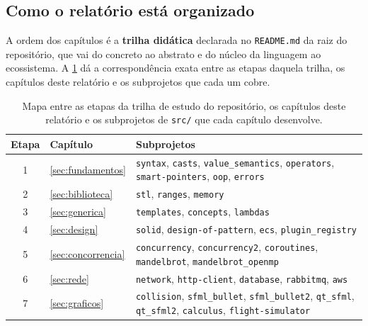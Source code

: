 \subsection{Como o relatório está organizado}
\label{sec:organizacao}

A ordem dos capítulos é a \textbf{trilha didática} declarada no
\texttt{README.md} da raiz do repositório, que vai do concreto ao abstrato e do
núcleo da linguagem ao ecossistema. A \cref{tab:mapa-capitulos} dá a
correspondência exata entre as etapas daquela trilha, os capítulos deste
relatório e os subprojetos que cada um cobre.

\begin{table}[htbp]
\centering
\caption{Mapa entre as etapas da trilha de estudo do repositório, os capítulos
         deste relatório e os subprojetos de \texttt{src/} que cada capítulo
         desenvolve.}
\label{tab:mapa-capitulos}
\footnotesize
\begin{tabular}{@{}clp{}@{}}
\toprule
\textbf{Etapa} & \textbf{Capítulo} & \textbf{Subprojetos} \\
\midrule
1 & \cref{sec:fundamentos}  & \texttt{syntax}, \texttt{casts},
                               \texttt{value\_semantics}, \texttt{operators},
                               \texttt{smart-pointers}, \texttt{oop},
                               \texttt{errors} \\
2 & \cref{sec:biblioteca}   & \texttt{stl}, \texttt{ranges}, \texttt{memory} \\
3 & \cref{sec:generica}     & \texttt{templates}, \texttt{concepts},
                               \texttt{lambdas} \\
4 & \cref{sec:design}       & \texttt{solid}, \texttt{design-of-pattern},
                               \texttt{ecs}, \texttt{plugin\_registry} \\
5 & \cref{sec:concorrencia} & \texttt{concurrency}, \texttt{concurrency2},
                               \texttt{coroutines}, \texttt{mandelbrot},
                               \texttt{mandelbrot\_openmp} \\
6 & \cref{sec:rede}         & \texttt{network}, \texttt{http-client},
                               \texttt{database}, \texttt{rabbitmq},
                               \texttt{aws} \\
7 & \cref{sec:graficos}     & \texttt{collision}, \texttt{sfml\_bullet},
                               \texttt{sfml\_bullet2}, \texttt{qt\_sfml},
                               \texttt{qt\_sfml2}, \texttt{calculus},
                               \texttt{flight-simulator} \\

\end{tabular}
\end{table}
